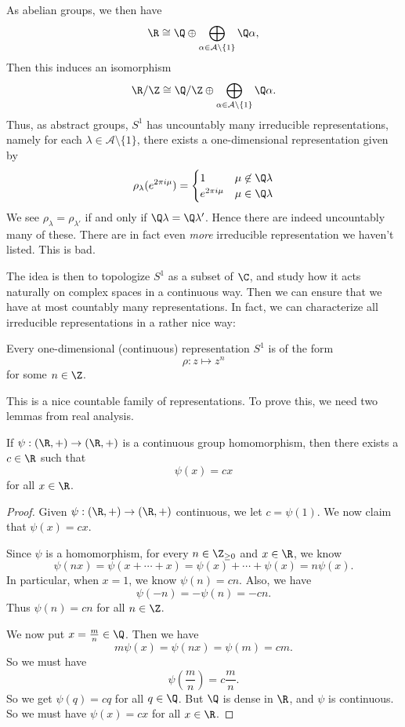 \documentclass[a4paper]{article}
\begin{document}
As abelian groups, we then have
\[
  \R \cong \Q \oplus \bigoplus_{\alpha \in \mathcal{A}\setminus\{1\}} \Q\alpha,
\]
Then this induces an isomorphism
\[
  \R/\Z \cong \Q/\Z \oplus \bigoplus_{\alpha \in \mathcal{A}\setminus \{1\}} \Q\alpha.
\]
Thus, as abstract groups, $S^1$ has uncountably many irreducible representations, namely for each $\lambda \in \mathcal{A} \setminus \{1\}$, there exists a one-dimensional representation given by
\[
  \rho_\lambda(e^{2\pi i \mu}) =
  \begin{cases}
    1 & \mu \not\in \Q \lambda\\
    e^{2\pi i\mu} & \mu \in \Q\lambda
  \end{cases}
\]
We see $\rho_\lambda = \rho_{\lambda'}$ if and only if $\Q \lambda = \Q \lambda'$. Hence there are indeed uncountably many of these. There are in fact even \emph{more} irreducible representation we haven't listed. This is bad.

The idea is then to topologize $S^1$ as a subset of $\C$, and study how it acts naturally on complex spaces in a continuous way. Then we can ensure that we have at most countably many representations. In fact, we can characterize all irreducible representations in a rather nice way:

\begin{thm}
  Every one-dimensional (continuous) representation $S^1$ is of the form
  \[
    \rho: z \mapsto z^n
  \]
  for some $n \in \Z$.
\end{thm}
This is a nice countable family of representations. To prove this, we need two lemmas from real analysis.

\begin{lemma}
  If $\psi: (\R, +) \to (\R, +)$ is a continuous group homomorphism, then there exists a $c \in \R$ such that
  \[
    \psi(x) = cx
  \]
  for all $x \in \R$.
\end{lemma}

\begin{proof}
  Given $\psi: (\R, +) \to (\R, +)$ continuous, we let $c = \psi(1)$. We now claim that $\psi(x) = cx$.

  Since $\psi$ is a homomorphism, for every $n \in \Z_{\geq 0}$ and $x \in \R$, we know
  \[
    \psi(nx) = \psi(x + \cdots + x) = \psi(x) + \cdots + \psi(x) = n \psi(x).
  \]
  In particular, when $x = 1$, we know $\psi(n) = cn$. Also, we have
  \[
    \psi(-n) = -\psi(n) = -cn.
  \]
  Thus $\psi(n) = cn$ for all $n \in \Z$.

  We now put $x = \frac{m}{n} \in \Q$. Then we have
  \[
    m\psi(x) = \psi(nx) = \psi(m) = cm.
  \]
  So we must have
  \[
    \psi\left(\frac{m}n{}\right) = c \frac{m}{n}.
  \]
  So we get $\psi(q) = cq$ for all $q \in \Q$. But $\Q$ is dense in $\R$, and $\psi$ is continuous. So we must have $\psi(x) = cx$ for all $x \in \R$.
\end{proof}
\end{document}

